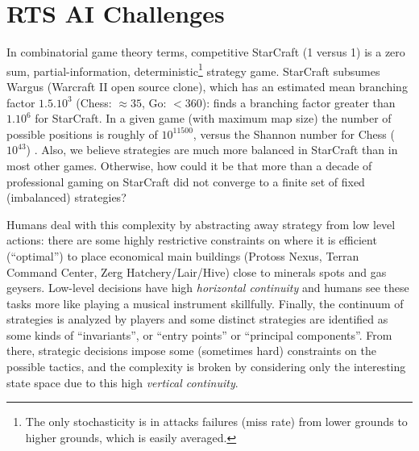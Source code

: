 \section{RTS AI Challenges}
In combinatorial game theory terms, competitive StarCraft (1 versus 1) is a zero sum, partial-information, deterministic\footnote{The only stochasticity is in attacks failures (miss rate) from lower grounds to higher grounds, which is easily averaged.} strategy game. 
StarCraft subsumes Wargus (Warcraft II open source clone), which has an estimated mean branching factor $1.5.10^3$ \citep{LTW} (Chess: $\approx 35$, Go: $<360$): \cite{bgweberPhD} finds a branching factor greater than $1.10^6$ for StarCraft. In a given game (with maximum map size) the number of possible positions is roughly of $10^{11500}$, versus the Shannon number for Chess ($10^{43}$) \citep{Shannon_1950}. Also, we believe strategies are much more balanced in StarCraft than in most other games. Otherwise, how could it be that more than a decade of professional gaming on StarCraft did not converge to a finite set of fixed (imbalanced) strategies?

Humans deal with this complexity by abstracting away strategy from low level actions: there are some highly restrictive constraints on where it is efficient (``optimal'') to place economical main buildings (Protoss Nexus, Terran Command Center, Zerg Hatchery/Lair/Hive) close to minerals spots and gas geysers. Low-level  decisions have high \textit{horizontal continuity} and humans see these tasks more like playing a musical instrument skillfully. Finally, the continuum of strategies is analyzed by players and some distinct strategies are identified as some kinds of ``invariants'', or ``entry points'' or ``principal components''. From there, strategic decisions impose some (sometimes hard) constraints on the possible tactics, and the complexity is broken by considering only the interesting state space due to this high \textit{vertical continuity}.

